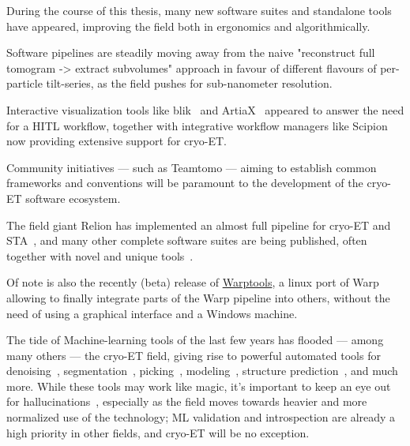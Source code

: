 During the course of this thesis, many new software suites and standalone tools have appeared, improving the field both in ergonomics and algorithmically.

Software pipelines are steadily moving away from the naive "reconstruct full tomogram -> extract subvolumes" approach in favour of different flavours of per-particle tilt-series, as the field pushes for sub-nanometer resolution.

Interactive visualization tools like blik~\cite{gaifasBlikExtensible3D2024} and ArtiaX~\cite{ermelArtiaXElectronTomography2022} appeared to answer the need for a HITL workflow, together with integrative workflow managers like Scipion~\cite{delarosa-trevinScipionSoftwareFramework2016} now providing extensive support for cryo-ET.

Community initiatives --- such as Teamtomo --- aiming to establish common frameworks and conventions will be paramount to the development of the cryo-ET software ecosystem.

The field giant Relion has implemented an almost full pipeline for cryo-ET and STA~\cite{zivanovBayesianApproachSingleparticle2022,burtImageProcessingPipeline2024}, and many other complete software suites are being published, often together with novel and unique tools~\cite{balyschewStreamlinedStructureDetermination2023,galaz-montoyaSingleParticleTomography2015,galaz-montoyaAlignmentAlgorithmsPerparticle2016,himesEmClaritySoftwareHighresolution2018,liuNextPYPComprehensiveScalable2023}.

Of note is also the recently (beta) release of \href{https://github.com/warpem/warp}{Warptools}, a linux port of Warp~\cite{tegunovRealtimeCryoelectronMicroscopy2019} allowing to finally integrate parts of the Warp pipeline into others, without the need of using a graphical interface and a Windows machine.

The tide of Machine-learning tools of the last few years has flooded --- among many others --- the cryo-ET field, giving rise to powerful automated tools for denoising~\cite{beplerTopazDenoiseGeneralDeep2020}, segmentation~\cite{lammMemBrainV2Endtoend2024,eisensteinSmartParallelAutomated2024}, picking~\cite{wagnerEvolutionSPHIREcrYOLOParticle2020,riceTomoTwinGeneralized3D2023}, modeling~\cite{jamaliAutomatedModelBuilding2024}, structure prediction~\cite{jumperHighlyAccurateProtein2021,abramsonAccurateStructurePrediction2024,baekAccuratePredictionProtein2021}, and much more.
While these tools may work like magic, it's important to keep an eye out for hallucinations~\cite{maynezFaithfulnessFactualityAbstractive2020}, especially as the field moves towards heavier and more normalized use of the technology; ML validation and introspection are already a high priority in other fields, and cryo-ET will be no exception.

